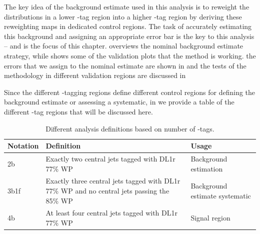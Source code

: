 \begin{table}[h]
	\centering
	\caption{Percentage of the data-driven background estimate expected to be composed of \ttbar events for the ggF 4b (left) and VBF 4b categories (right).}
	\label{tab:ttbar-proportion}
\end{table}

The key idea of the background estimate used in this analysis is to reweight the distributions in a lower \Pqb-tag region into a higher \Pqb-tag region by deriving these reweighting maps in dedicated control regions. The task of accurately estimating this background and assigning an appropriate error bar is the key to this analysis -- and is the focus of this chapter. 
\Sect{\ref{sec:rw-overview}} overviews the nominal background estimate strategy, while \Sect{\ref{sec:bkg-val-plots}} shows some of the validation plots that the method is working. the errors that we assign to the nominal estimate are shown in \Sect{\ref{sec:bkg-systs}} and the tests of the methodology in different validation regions are discussed in \Sect{\ref{sec:bkg-val-regns}}

Since the different \Pqb-tagging regions define different control regions for defining the background estimate or assessing a systematic, in \Tab{\ref{tab:b-tag-cat}} we provide a table of the different \Pqb-tag regions that will be discussed here.

\begin{table}[!htbp]
	\centering
	  \begin{tabularx}{\textwidth}{l|X|l}
	  Notation     & Definition & Usage \\
	  \toprule
	  2b    & Exactly two central jets tagged with DL1r 77\% WP & Background estimation \\ \hline
	  3b1f  & Exactly three central jets tagged with DL1r 77\% WP and no central jets passing the 85\% WP & Background estimate systematic \\ \hline
	  4b    & At least four central jets tagged with DL1r 77\% WP & Signal region \\
	  \bottomrule
	  \end{tabularx}
	\caption{Different analysis definitions based on number of \Pqb-tags.}
	\label{tab:b-tag-cat}
  \end{table}%

